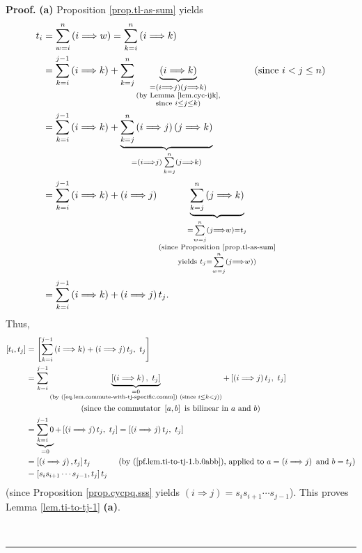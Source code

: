 \documentclass[numbers=enddot,12pt,final,onecolumn,notitlepage]{scrartcl}%
\theoremstyle{definition}
\newenvironment{proof}[1][Proof]{\noindent\textbf{#1.} }{\ \rule{0.5em}{0.5em}}
\let\sumnonlimits\sum
\renewcommand{\sum}{\sumnonlimits\limits}
\begin{document}
\begin{proof}
\textbf{(a)} Proposition \ref{prop.tl-as-sum} yields%
\begin{align*}
t_{i}  &  =\sum_{w=i}^{n}\left(  i\Longrightarrow w\right)  =\sum_{k=i}%
^{n}\left(  i\Longrightarrow k\right) \\
&  =\sum_{k=i}^{j-1}\left(  i\Longrightarrow k\right)  +\sum_{k=j}%
^{n}\underbrace{\left(  i\Longrightarrow k\right)  }_{\substack{=\left(
i\Longrightarrow j\right)  \left(  j\Longrightarrow k\right)  \\\text{(by
Lemma \ref{lem.cyc-ijk},}\\\text{since }i\leq j\leq k\text{)}}%
}\ \ \ \ \ \ \ \ \ \ \left(  \text{since }i<j\leq n\right) \\
&  =\sum_{k=i}^{j-1}\left(  i\Longrightarrow k\right)  +\underbrace{\sum
_{k=j}^{n}\left(  i\Longrightarrow j\right)  \left(  j\Longrightarrow
k\right)  }_{=\left(  i\Longrightarrow j\right)  \sum_{k=j}^{n}\left(
j\Longrightarrow k\right)  }\\
&  =\sum_{k=i}^{j-1}\left(  i\Longrightarrow k\right)  +\left(
i\Longrightarrow j\right)  \underbrace{\sum_{k=j}^{n}\left(  j\Longrightarrow
k\right)  }_{\substack{=\sum_{w=j}^{n}\left(  j\Longrightarrow w\right)
=t_{j}\\\text{(since Proposition \ref{prop.tl-as-sum}}\\\text{yields }%
t_{j}=\sum_{w=j}^{n}\left(  j\Longrightarrow w\right)  \text{)}}}\\
&  =\sum_{k=i}^{j-1}\left(  i\Longrightarrow k\right)  +\left(
i\Longrightarrow j\right)  t_{j}.
\end{align*}
Thus,%
\begin{align*}
\left[  t_{i},t_{j}\right]   &  =\left[  \sum_{k=i}^{j-1}\left(
i\Longrightarrow k\right)  +\left(  i\Longrightarrow j\right)  t_{j}%
,\ t_{j}\right] \\
&  =\sum_{k=i}^{j-1}\underbrace{\left[  \left(  i\Longrightarrow k\right)
,\ t_{j}\right]  }_{\substack{=0\\\text{(by
(\ref{eq.lem.commute-with-tj-specific.comm}) (since }i\leq k<j\text{))}%
}}+\left[  \left(  i\Longrightarrow j\right)  t_{j},\ t_{j}\right] \\
&  \ \ \ \ \ \ \ \ \ \ \ \ \ \ \ \ \ \ \ \ \left(  \text{since the commutator
}\left[  a,b\right]  \text{ is bilinear in }a\text{ and }b\right) \\
&  =\underbrace{\sum_{k=i}^{j-1}0}_{=0}+\left[  \left(  i\Longrightarrow
j\right)  t_{j},\ t_{j}\right]  =\left[  \left(  i\Longrightarrow j\right)
t_{j},\ t_{j}\right] \\
&  =\left[  \left(  i\Longrightarrow j\right)  ,t_{j}\right]  t_{j}%
\ \ \ \ \ \ \ \ \ \ \left(  \text{by (\ref{pf.lem.ti-to-tj-1.b.0abb}), applied
to }a=\left(  i\Longrightarrow j\right)  \text{ and }b=t_{j}\right) \\
&  =\left[  s_{i}s_{i+1}\cdots s_{j-1},t_{j}\right]  t_{j}%
\end{align*}
(since Proposition \ref{prop.cycpq.sss} yields $\left(  i\Longrightarrow
j\right)  =s_{i}s_{i+1}\cdots s_{j-1}$). This proves Lemma
\ref{lem.ti-to-tj-1} \textbf{(a)}. \medskip


\end{proof}
\end{document}
